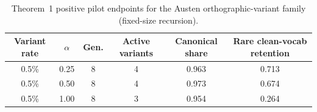 \begin{table}[t]
\centering
\footnotesize
\setlength{\tabcolsep}{3.5pt}
\caption{Theorem~1 positive pilot endpoints for the Austen orthographic-variant family (fixed-size recursion).}
\label{tab:appx-theorem1-positive-endpoints}
\begin{tabular}{cccccc}
\toprule
Variant rate & $\alpha$ & Gen. & Active variants & Canonical share & Rare clean-vocab retention \\
\midrule
0.5\% & 0.25 & 8 & 4 & 0.963 & 0.713 \\
0.5\% & 0.50 & 8 & 4 & 0.973 & 0.674 \\
0.5\% & 1.00 & 8 & 3 & 0.954 & 0.264 \\
\bottomrule
\end{tabular}
\end{table}
